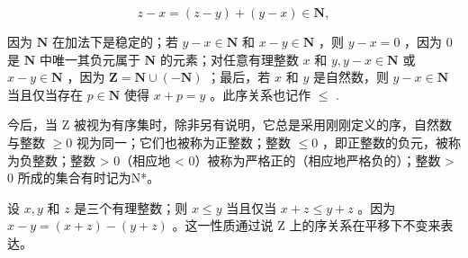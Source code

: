 \[
z - x = (z - y) + (y - x) \in \mathbf {N},
\]

因为 \(\mathbf{N}\) 在加法下是稳定的；若 \(y - x \in \mathbf{N}\) 和 \(x - y \in \mathbf{N}\) ，则 \(y - x = 0\) ，因为 \(0\) 是 \(\mathbf{N}\) 中唯一其负元属于 \(\mathbf{N}\) 的元素；对任意有理整数 \(x\) 和 \(y, y - x \in \mathbf{N}\) 或 \(x - y \in \mathbf{N}\) ，因为 \(\mathbf{Z} = \mathbf{N} \cup (-\mathbf{N})\) ；最后，若 \(x\) 和 \(y\) 是自然数，则 \(y - x \in \mathbf{N}\) 当且仅当存在 \(p \in \mathbf{N}\) 使得 \(x + p = y\) 。此序关系也记作 \(\leqslant\) .

今后，当 Z 被视为有序集时，除非另有说明，它总是采用刚刚定义的序，自然数与整数 \(\geqslant 0\) 视为同一；它们也被称为正整数；整数 \(\leqslant 0\) ，即正整数的负元，被称为负整数；整数 \textgreater{} 0（相应地 \textless{} 0）被称为严格正的（相应地严格负的）；整数 \textgreater{} 0 所成的集合有时记为N*。

设 \(x, y\) 和 \(z\) 是三个有理整数；则 \(x \leqslant y\) 当且仅当 \(x + z \leqslant y + z\) 。因为 \(x - y = (x + z) - (y + z)\) 。这一性质通过说 Z 上的序关系在平移下不变来表达。

